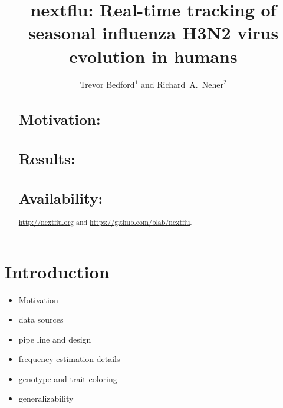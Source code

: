 \documentclass{bioinfo}
\begin{document}
\title[Tracking of seasonal influenza H3N2 virus evolution]{nextflu: Real-time tracking of seasonal influenza H3N2 virus evolution in humans}
\author{Trevor Bedford$^{1}$ and Richard~A.~Neher$^{2}$} %
\address{$^{2}$Max Planck Institute for Developmental Biology, 72076 T\"ubingen,
Germany}


\maketitle



\begin{abstract}
\section{Motivation:}
\section{Results:}
\section{Availability:} \url{http://nextflu.org} and \url{https://github.com/blab/nextflu}.
\end{abstract}

\section*{Introduction}

\begin{itemize}
	\item Motivation
	\item data sources
	\item pipe line and design
	\item frequency estimation details
	\item genotype and trait coloring
	\item generalizability
\end{itemize}
\end{document}
